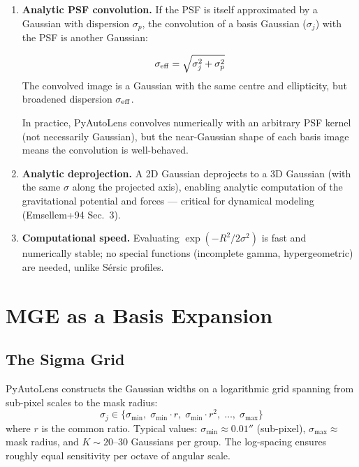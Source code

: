 \documentclass[11pt, letterpaper]{article}
\begin{document}
\begin{enumerate}[nosep]
  \item \textbf{Analytic PSF convolution.}  If the PSF is itself
    approximated by a Gaussian with dispersion $\sigma_p$, the
    convolution of a basis Gaussian ($\sigma_j$) with the PSF is another
    Gaussian:

    \begin{keyresult}[title={Gaussian Convolution Property}]
    \begin{equation}
      \sigma_{\rm eff} = \sqrt{\sigma_j^2 + \sigma_p^2}
      \label{eq:conv-property}
    \end{equation}
    The convolved image is a Gaussian with the same centre and
    ellipticity, but broadened dispersion $\sigma_{\rm eff}$.
    \end{keyresult}

    In practice, PyAutoLens convolves numerically with an arbitrary PSF
    kernel (not necessarily Gaussian), but the near-Gaussian shape of
    each basis image means the convolution is well-behaved.

  \item \textbf{Analytic deprojection.}  A 2D Gaussian deprojects to a
    3D Gaussian (with the same $\sigma$ along the projected axis),
    enabling analytic computation of the gravitational potential and
    forces --- critical for dynamical modeling (Emsellem+94 Sec.~3).

  \item \textbf{Computational speed.}  Evaluating $\exp(-R^2/2\sigma^2)$
    is fast and numerically stable; no special functions (incomplete
    gamma, hypergeometric) are needed, unlike S\'ersic profiles.
\end{enumerate}

\section{MGE as a Basis Expansion}
\label{sec:mge-basis}

\subsection{The Sigma Grid}

PyAutoLens constructs the Gaussian widths on a logarithmic grid spanning
from sub-pixel scales to the mask radius:
\[
  \sigma_j \in \bigl\{\sigma_{\min},\;
  \sigma_{\min}\cdot r,\;
  \sigma_{\min}\cdot r^2,\;
  \ldots,\;
  \sigma_{\max}\bigr\}
\]
where $r$ is the common ratio.  Typical values: $\sigma_{\min} \approx
0.01''$ (sub-pixel), $\sigma_{\max} \approx$ mask radius, and
$K \sim 20$--30 Gaussians per group.  The log-spacing ensures roughly
equal sensitivity per octave of angular scale.
\end{document}
